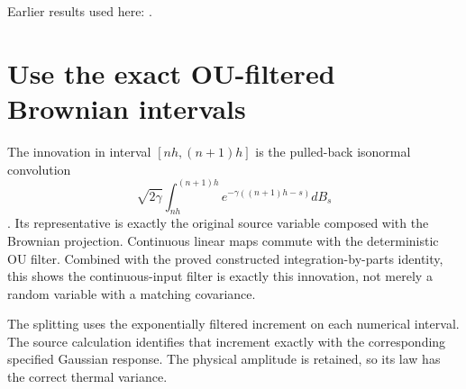 \documentclass[11pt,a4paper]{article}
\begin{document}
Earlier results used here: \cite[Section~3.8.17]{LangevinLean2026ULASC}.

\section{\texorpdfstring{Use the exact OU-filtered Brownian intervals}{Use the exact OU-filtered Brownian intervals}}


The innovation in interval \([nh,(n+1)h]\) is the pulled-back isonormal convolution
\[\sqrt{2\gamma}\int_{nh}^{(n+1)h}e^{-\gamma((n+1)h-s)}dB_s\]
. Its representative is exactly the original source variable composed with the Brownian projection. Continuous linear maps commute with the deterministic OU filter. Combined with the proved constructed integration-by-parts identity, this shows the continuous-input filter is exactly this innovation, not merely a random variable with a matching covariance.



The splitting uses the exponentially filtered increment on each numerical interval. The source calculation identifies that increment exactly with the corresponding specified Gaussian response. The physical amplitude is retained, so its law has the correct thermal variance.
\end{document}
